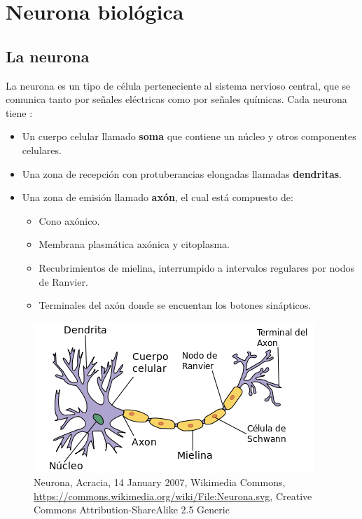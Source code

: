 \section{Neurona biológica}
\subsection{La neurona}

La neurona es un tipo de célula perteneciente al sistema nervioso central, que se comunica tanto por señales eléctricas como por señales químicas. Cada neurona tiene \parencite{sistemaNervioso}:%


 \begin{itemize}
	\item Un cuerpo celular llamado \textbf{soma} que contiene un núcleo y otros componentes celulares.
	\item Una zona de recepción con protuberancias elongadas llamadas \textbf{dendritas}.
	\item Una zona de emisión llamado \textbf{axón}, el cual está compuesto de:
		\begin {itemize}
			\item Cono axónico.
			\item Membrana plasmática axónica y citoplasma.
			\item Recubrimientos de mielina, interrumpido a intervalos regulares por nodos de Ranvier.
			\item Terminales del axón donde se encuentan los botones sinápticos. 
		\end{itemize}
 \end{itemize}


\begin{figure}[h]
 \centering
 \includegraphics[scale=0.6]{../Figuras/neuronaPartes.png}
 \caption{Neurona, Acracia, 14 January 2007, Wikimedia Commons, \url{https://commons.wikimedia.org/wiki/File:Neurona.svg}, Creative Commons Attribution-ShareAlike 2.5 Generic}
 \label{fig:neuronaP}
\end{figure}

